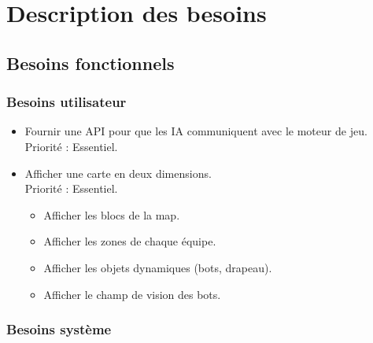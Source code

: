 \documentclass[french]{article}
\begin{document}
\section{Description des besoins}

\subsection{Besoins fonctionnels}
\subsubsection{Besoins utilisateur}
    \begin{itemize}
        \item Fournir une API pour que les IA communiquent avec le moteur de jeu. \\
                Priorité : Essentiel.\\

        \item Afficher une carte en deux dimensions. \\
            Priorité : Essentiel.
            \begin{itemize}
                \item Afficher les blocs de la map.
                \item Afficher les zones de chaque équipe.
                \item Afficher les objets dynamiques (bots, drapeau).
                \item Afficher le champ de vision des bots.
            \end{itemize}

    \end{itemize}

\subsubsection{Besoins système}
    
\end{document}
